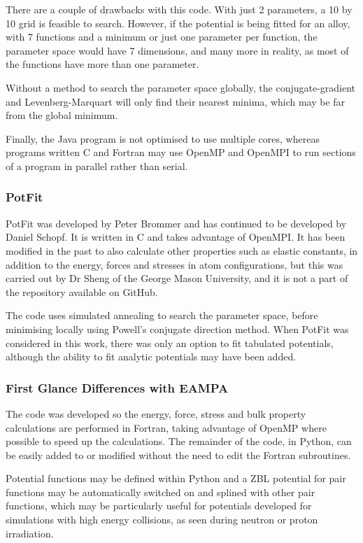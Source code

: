 There are a couple of drawbacks with this code.  With just 2 parameters, a 10 by 10 grid is feasible to search.  However, if the potential is being fitted for an alloy, with 7 functions and a minimum or just one parameter per function, the parameter space would have 7 dimensions, and many more in reality, as most of the functions have more than one parameter.

Without a method to search the parameter space globally, the conjugate-gradient and Levenberg-Marquart will only find their nearest minima, which may be far from the global minimum.  

Finally, the Java program is not optimised to use multiple cores, whereas programs written C and Fortran may use OpenMP and OpenMPI to run sections of a program in parallel rather than serial.


\subsubsection{PotFit}

PotFit was developed by Peter Brommer and has continued to be developed by Daniel Schopf.  It is written in C and takes advantage of OpenMPI.  It has been modified in the past to also calculate other properties such as elastic constants, in addition to the energy, forces and stresses in atom configurations, but this was carried out by Dr Sheng of the George Mason University, and it is not a part of the repository available on GitHub.

The code uses simulated annealing to search the parameter space, before minimising locally using Powell's conjugate direction method.  When PotFit was considered in this work, there was only an option to fit tabulated potentials, although the ability to fit analytic potentials may have been added.


\subsubsection{First Glance Differences with EAMPA}

The code was developed so the energy, force, stress and bulk property calculations are performed in Fortran, taking advantage of OpenMP where possible to speed up the calculations.  The remainder of the code, in Python, can be easily added to or modified without the need to edit the Fortran subroutines.

Potential functions may be defined within Python and a ZBL potential for pair functions may be automatically switched on and splined with other pair functions, which may be particularly useful for potentials developed for simulations with high energy collisions, as seen during neutron or proton irradiation.

